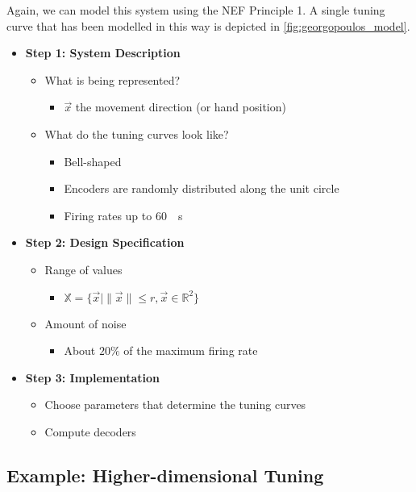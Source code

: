\documentclass[10pt,letterpaper,oneside]{article}
\begin{document}
Again, we can model this system using the NEF Principle 1. A single tuning curve that has been modelled in this way is depicted in \cref{fig:georgopoulos_model}.
\begin{multicols}{2}
	\begin{itemize}
		\item \textbf{Step 1: System Description}
		\begin{itemize}
			\item What is being represented?
			\begin{itemize}
				\item $\vec x$ the movement direction (or hand position)
			\end{itemize}
			\item What do the tuning curves look like?
			\begin{itemize}
				\item Bell-shaped
				\item Encoders are randomly distributed along the unit circle
				\item Firing rates up to \SI{60}{\per\second}
			\end{itemize}
		\end{itemize}
		\columnbreak
		\item \textbf{Step 2: Design Specification}
		\begin{itemize}
			\item Range of values
			\begin{itemize}
				\item $\mathbb{X} = \{\vec x \mid \|\vec x\| \leq r, \vec x \in \mathbb{R}^2 \}$
			\end{itemize}
			\item Amount of noise
			\begin{itemize}
				\item About $20\%$ of the maximum firing rate
			\end{itemize}
		\end{itemize}
		\item \textbf{Step 3: Implementation}
		\begin{itemize}
			\item Choose parameters that determine the tuning curves
			\item Compute decoders
		\end{itemize}
	\end{itemize}
\end{multicols}

\subsection{Example: Higher-dimensional Tuning}
\end{document}
